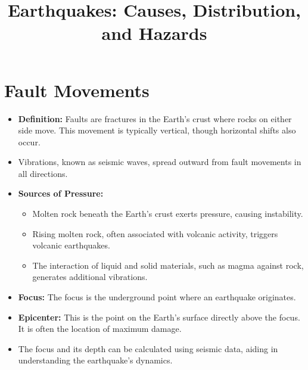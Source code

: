 \documentclass[12pt]{article}
\title{Earthquakes: Causes, Distribution, and Hazards}
\author{}
\date{}
\begin{document}
\maketitle

\section*{Fault Movements}
\begin{itemize}
    \item \textbf{Definition:} Faults are fractures in the Earth's crust where rocks on either side move. This movement is typically vertical, though horizontal shifts also occur.
    \item Vibrations, known as seismic waves, spread outward from fault movements in all directions.
    \item \textbf{Sources of Pressure:}
    \begin{itemize}
        \item Molten rock beneath the Earth's crust exerts pressure, causing instability.
        \item Rising molten rock, often associated with volcanic activity, triggers volcanic earthquakes.
        \item The interaction of liquid and solid materials, such as magma against rock, generates additional vibrations.
    \end{itemize}
    \item \textbf{Focus:} The focus is the underground point where an earthquake originates.
    \item \textbf{Epicenter:} This is the point on the Earth's surface directly above the focus. It is often the location of maximum damage.
    \item The focus and its depth can be calculated using seismic data, aiding in understanding the earthquake's dynamics.
\end{itemize}
\end{document}
